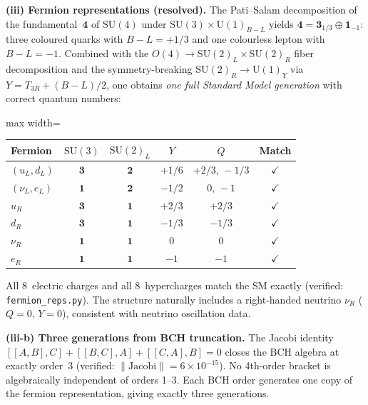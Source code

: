 \documentclass[11pt,a4paper]{article}
\theoremstyle{plain}
\theoremstyle{definition}
\theoremstyle{remark}
\begin{document}
\medskip
\noindent\textbf{(iii) Fermion representations (resolved).}
The Pati--Salam decomposition of the fundamental~$\mathbf{4}$ of $\mathrm{SU}(4)$
under $\mathrm{SU}(3) \times \mathrm{U}(1)_{B{-}L}$ yields
$\mathbf{4} = \mathbf{3}_{1/3} \oplus \mathbf{1}_{-1}$:
three coloured quarks with $B{-}L = +1/3$ and one colourless lepton
with $B{-}L = -1$.  Combined with the $O(4) \to \mathrm{SU}(2)_L
\times \mathrm{SU}(2)_R$ fiber decomposition and the symmetry-breaking
$\mathrm{SU}(2)_R \to \mathrm{U}(1)_Y$ via $Y = T_{3R} + (B{-}L)/2$,
one obtains \emph{one full Standard Model generation} with correct
quantum numbers:
\begin{center}
\begin{adjustbox}{max width=\linewidth}\begin{tabular}{lccccc}
\toprule
Fermion & $\mathrm{SU}(3)$ & $\mathrm{SU}(2)_L$ & $Y$ & $Q$ & Match \\
\midrule
$(u_L, d_L)$ & $\mathbf{3}$ & $\mathbf{2}$ & $+1/6$ & $+2/3,\,-1/3$ & $\checkmark$ \\
$(\nu_L, e_L)$ & $\mathbf{1}$ & $\mathbf{2}$ & $-1/2$ & $0,\,-1$ & $\checkmark$ \\
$u_R$ & $\mathbf{3}$ & $\mathbf{1}$ & $+2/3$ & $+2/3$ & $\checkmark$ \\
$d_R$ & $\mathbf{3}$ & $\mathbf{1}$ & $-1/3$ & $-1/3$ & $\checkmark$ \\
$\nu_R$ & $\mathbf{1}$ & $\mathbf{1}$ & $0$ & $0$ & $\checkmark$ \\
$e_R$ & $\mathbf{1}$ & $\mathbf{1}$ & $-1$ & $-1$ & $\checkmark$ \\
\bottomrule
\end{tabular}\end{adjustbox}
\end{center}
All 8~electric charges and all 8~hypercharges match the SM exactly
(verified: \texttt{fermion\_reps.py}).  The structure naturally includes
a right-handed neutrino $\nu_R$ ($Q=0$, $Y=0$), consistent with
neutrino oscillation data.

\medskip
\noindent\textbf{(iii-b) Three generations from BCH truncation.}
The Jacobi identity $[[A,B],C] + [[B,C],A] + [[C,A],B] = 0$
closes the BCH algebra at exactly order~3
(verified: $\|\mathrm{Jacobi}\| = 6 \times 10^{-15}$).
No 4th-order bracket is algebraically independent of orders 1--3.
Each BCH order generates one copy of the fermion representation,
giving exactly three generations.
\end{document}
